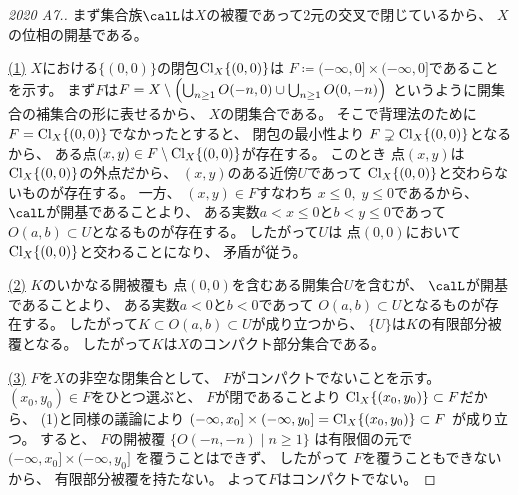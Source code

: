 \documentclass[report]{jlreq}
\begin{document}
\newpage
\begin{proof}[2020 A7.]
    まず集合族$\calL$は$X$の被覆であって2元の交叉で閉じているから、
    $X$の位相の開基である。

    \uline{(1)} \quad
    $X$における$\{ (0, 0) \}$の閉包$\operatorname{Cl}_X \{ (0, 0) \}$は
    $F \coloneqq (-\infty, 0] \times (-\infty, 0]$であることを示す。
    まず$F$は$F = X \setminus \left({
        \bigcup_{n \ge 1} O(-n, 0)
        \cup
        \bigcup_{n \ge 1} O(0, -n)
    }\right)$
    というように開集合の補集合の形に表せるから、
    $X$の閉集合である。
    そこで背理法のために$F = \operatorname{Cl}_X \{ (0, 0) \}$でなかったとすると、
    閉包の最小性より
    $F \supsetneq \operatorname{Cl}_X \{ (0, 0) \}$となるから、
    ある点$(x, y) \in F \setminus \operatorname{Cl}_X \{ (0, 0) \}$が存在する。
    このとき
    点$(x, y)$は$\operatorname{Cl}_X \{ (0, 0) \}$の外点だから、
    $(x, y)$のある近傍$U$であって
    $\operatorname{Cl}_X \{ (0, 0) \}$と交わらないものが存在する。
    一方、
    $(x, y) \in F$すなわち
    $x \le 0, \; y \le 0$であるから、
    $\calL$が開基であることより、
    ある実数$a < x \le 0$と$b < y \le 0$であって
    $O(a, b) \subset U$となるものが存在する。
    したがって$U$は
    点$(0, 0)$において$\operatorname{Cl}_X \{ (0, 0) \}$と交わることになり、
    矛盾が従う。

    \uline{(2)} \quad
    $K$のいかなる開被覆も
    点$(0, 0)$を含むある開集合$U$を含むが、
    $\calL$が開基であることより、
    ある実数$a < 0$と$b < 0$であって
    $O(a, b) \subset U$となるものが存在する。
    したがって$K \subset O(a, b) \subset U$が成り立つから、
    $\{ U \}$は$K$の有限部分被覆となる。
    したがって$K$は$X$のコンパクト部分集合である。

    \uline{(3)} \quad
    $F$を$X$の非空な閉集合として、
    $F$がコンパクトでないことを示す。
    $(x_0, y_0) \in F$をひとつ選ぶと、
    $F$が閉であることより
    $\operatorname{Cl}_X \{ (x_0, y_0) \} \subset F$だから、
    (1)と同様の議論により
    $(-\infty, x_0] \times (-\infty, y_0]
        = \operatorname{Cl}_X \{ (x_0, y_0) \}
        \subset F$
    が成り立つ。
    すると、
    $F$の開被覆
    $\{ O(-n, -n) \mid n \ge 1 \}$
    は有限個の元で
    $(-\infty, x_0] \times (-\infty, y_0]$
    を覆うことはできず、
    したがって
    $F$を覆うこともできないから、
    有限部分被覆を持たない。
    よって$F$はコンパクトでない。
\end{proof}
\end{document}
